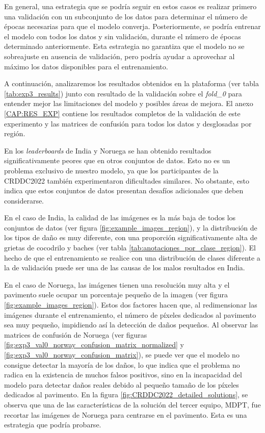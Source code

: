 En general, una estrategia que se podría seguir en estos casos es realizar primero una validación con un subconjunto de los datos para determinar el número de épocas necesarias para que el modelo converja. Posteriormente, se podría entrenar el modelo con todos los datos y sin validación, durante el número de épocas determinado anteriormente. Esta estrategia no garantiza que el modelo no se sobreajuste en ausencia de validación, pero podría ayudar a aprovechar al máximo los datos disponibles para el entrenamiento.

A continuación, analizaremos los resultados obtenidos en la plataforma (ver tabla \ref{tab:exp3_results}) junto con resultado de la validación sobre el \textit{fold\_0} para entender mejor las limitaciones del modelo y posibles áreas de mejora. El anexo \ref{CAP:RES_EXP} contiene los resultados completos de la validación de este experimento y las matrices de confusión para todos los datos y desglosadas por región. 

En los \textit{leaderboards} de India y Noruega se han obtenido resultados significativamente peores que en otros conjuntos de datos. Esto no es un problema exclusivo de nuestro modelo, ya que los participantes de la CRDDC2022 también experimentaron dificultades similares. No obstante, esto indica que estos conjuntos de datos presentan desafíos adicionales que deben considerarse.

En el caso de India, la calidad de las imágenes es la más baja de todos los conjuntos de datos (ver figura \ref{fig:example_images_region}), y la distribución de los tipos de daño es muy diferente, con una proporción significativamente alta de grietas de cocodrilo y baches (ver tabla \ref{tab:anotaciones_por_clase_region}). El hecho de que el entrenamiento se realice con una distribución de clases diferente a la de validación puede ser una de las causas de los malos resultados en India.

En el caso de Noruega, las imágenes tienen una resolución muy alta y el pavimento suele ocupar un porcentaje pequeño de la imagen (ver figura \ref{fig:example_images_region}). Estos dos factores hacen que, al redimensionar las imágenes durante el entrenamiento, el número de píxeles dedicados al pavimento sea muy pequeño, impidiendo así la detección de daños pequeños. Al observar las matrices de confusión de Noruega (ver figuras \ref{fig:exp3_val0_norway_confusion_matrix_normalized} y \ref{fig:exp3_val0_norway_confusion_matrix}), se puede ver que el modelo no consigue detectar la mayoría de los daños, lo que indica que el problema no radica en la existencia de muchos falsos positivos, sino en la incapacidad del modelo para detectar daños reales debido al pequeño tamaño de los píxeles dedicados al pavimento. En la figura \ref{fig:CRDDC2022_detailed_solutions}, se observa que una de las características de la solución del tercer equipo, MDPT, fue recortar las imágenes de Noruega para centrarse en el pavimento. Esta es una estrategia que podría probarse. 

